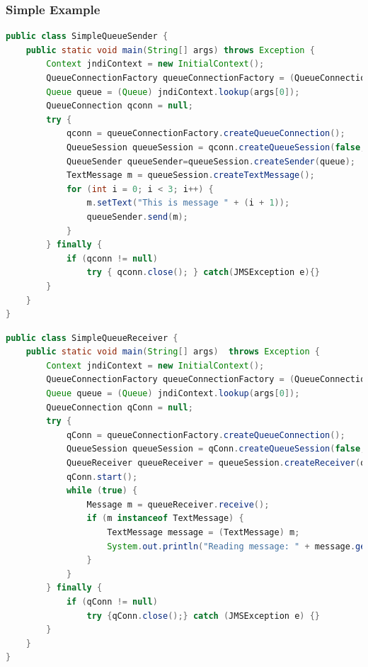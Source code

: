 \documentclass[10pt]{article}
\begin{document}
\subsubsection{Simple Example}
\begin{lstlisting}[language=Java, caption=Simple Example Sender, style=JavaStyle]
public class SimpleQueueSender {
	public static void main(String[] args) throws Exception {
		Context jndiContext = new InitialContext(); 
		QueueConnectionFactory queueConnectionFactory = (QueueConnectionFactory) jndiContext.lookup("QueueConnectionFactory");
		Queue queue = (Queue) jndiContext.lookup(args[0]);
		QueueConnection qconn = null;
		try {
			qconn = queueConnectionFactory.createQueueConnection(); 
			QueueSession queueSession = qconn.createQueueSession(false, Session.AUTO_ACKNOWLEDGE);
			QueueSender queueSender=queueSession.createSender(queue);
			TextMessage m = queueSession.createTextMessage();
			for (int i = 0; i < 3; i++) {
				m.setText("This is message " + (i + 1));
				queueSender.send(m);
			}
		} finally {
			if (qconn != null)
				try { qconn.close(); } catch(JMSException e){}
		}
	}
}
\end{lstlisting}
\begin{lstlisting}[language=Java, caption=Simple Example Receiver, style=JavaStyle]
public class SimpleQueueReceiver {
	public static void main(String[] args)  throws Exception {
		Context jndiContext = new InitialContext();
		QueueConnectionFactory queueConnectionFactory = (QueueConnectionFactory) jndiContext.lookup("QueueConnectionFactory");
		Queue queue = (Queue) jndiContext.lookup(args[0]);
		QueueConnection qConn = null;
		try {
			qConn = queueConnectionFactory.createQueueConnection(); 
			QueueSession queueSession = qConn.createQueueSession(false, Session.AUTO_ACKNOWLEDGE);
			QueueReceiver queueReceiver = queueSession.createReceiver(queue);
			qConn.start(); 
			while (true) {
				Message m = queueReceiver.receive();
				if (m instanceof TextMessage) {
					TextMessage message = (TextMessage) m;
					System.out.println("Reading message: " + message.getText());
				}
			}
		} finally {
			if (qConn != null)
				try {qConn.close();} catch (JMSException e) {}
		}
	}
}
\end{lstlisting}
\end{document}

